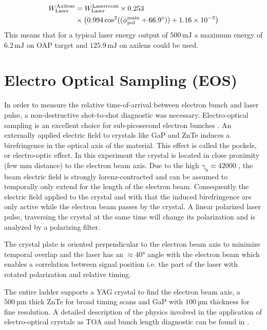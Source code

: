 \begin{align}
 W_\mathrm{Laser}^\mathrm{Axilens} &= W_\mathrm{Laser}^\mathrm{Laserroom}\times 0.253\\
  &\times\big( 0.994 \cos^2((\phi_\mathrm{pol}^\mathrm{main}+66.9\degree)) +1.16\times 10^{-3}\big)\\
\end{align}
This means that for a typical laser energy output of $500\, \mathrm{mJ}$ a maximum energy of $6.2\, \mathrm{mJ}$ on OAP target and $125.9\,\mathrm{mJ}$ on axilens could be used.


\section{Electro Optical Sampling (EOS)}
\label{sec:EOS}
In order to measure the relative time-of-arrival between electron bunch and laser pulse, a non-destructive shot-to-shot diagnostic was necessary. Electro-optical sampling is an excellent choice for sub-picosecond electron bunches \cite{YanX_EOS_PRL2000}.
An externally applied electric field to crystals like GaP and ZnTe induces a birefringence in the optical axis of the material. This effect is called the pockels, or electro-optic effect. In this experiment the crystal is  located in close proximity (few mm distance) to the electron beam axis. Due to the high $\gamma_\mathrm{b} \approx 42000$ , the beam electric field is strongly lorenz-contracted and can be assumed to temporally only extend for the length of the electron beam. Consequently the electric field applied to the crystal and with that the induced birefringence are only active while the electron beam passes by the crystal. 
A linear polarized laser pulse, traversing the crystal at the same time will change its polarization and is analyzed by a polarizing filter.

The crystal plate is oriented perpendicular to the electron beam axis to minimize temporal overlap and the laser has an $\approx 40°$ angle with the electron beam which enables a correlation between signal position i.e. the part of the laser with rotated polarization and relative timing.

The entire ladder supports a YAG crystal to find the electron beam axis, a $500\ \mathrm{µm}$ thick ZnTe for broad timing scans and GaP with $100\ \mathrm{µm}$ thickness for fine resolution.
A detailed description of the physics involved in the application of electro-optical crystals as TOA and bunch length diagnostic can be found in \cite{BerndSteffenPhD}.


